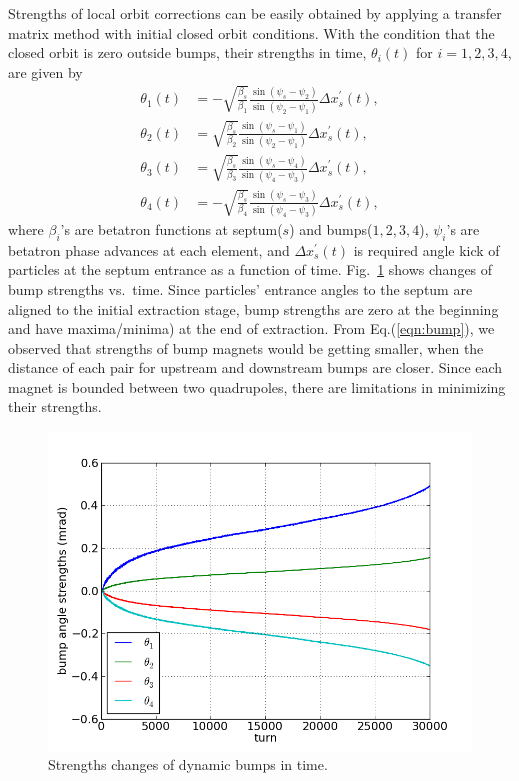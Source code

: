 \documentclass[aps,prstab,onecolumn,preprint]{revtex4-1}
\begin{document}
Strengths of local orbit corrections can be easily obtained by applying a transfer matrix method with initial closed orbit conditions. With the condition that the closed orbit is zero outside bumps, their strengths in time, $\theta_{i}(t)$ for $i=1,2,3,4$, are given by
\begin{equation}
  \begin{split}
  \theta_{1}(t) & = - \sqrt{\frac{\beta_{s}}{\beta_{1}}}
               \frac{\sin(\psi_{s} - \psi_{2})}
                    {\sin(\psi_{2} - \psi_{1})}
               \Delta x_{s}^{\prime} (t),
  \\ %
  \theta_{2}(t) & = \sqrt{\frac{\beta_{s}}{\beta_{2}}}
               \frac{\sin(\psi_{s} - \psi_{1})}
                    {\sin(\psi_{2} - \psi_{1})}
               \Delta x_{s}^{\prime} (t), \\
  \theta_{3}(t) & = \sqrt{\frac{\beta_{s}}{\beta_{3}}}
               \frac{\sin(\psi_{s} - \psi_{4})}
                    {\sin(\psi_{4} - \psi_{3})}
               \Delta x_{s}^{\prime} (t),
  \\ %
  \theta_{4}(t) & = - \sqrt{\frac{\beta_{s}}{\beta_{4}}}
               \frac{\sin(\psi_{s} - \psi_{3})}
                    {\sin(\psi_{4} - \psi_{3})}
               \Delta x_{s}^{\prime} (t),
  \end{split}
  \label{eqn:bump}
\end{equation}
where $\beta_{i}$'s are betatron functions at septum($s$) and bumps($1,2,3,4$), $\psi_{i}$'s are betatron phase advances at each element, and $\Delta x^{\prime}_{s} (t)$ is required angle kick of particles at the septum entrance as a function of time. Fig.~\ref{fig:bump3} shows changes of bump strengths vs.~time. Since particles' entrance angles to the septum are aligned to the initial extraction stage, bump strengths are zero at the beginning and have maxima/minima) at the end of extraction. From Eq.(\ref{eqn:bump}), we observed that strengths of bump magnets would be getting smaller, when the distance of each pair for upstream and downstream bumps are closer. Since each magnet is bounded between two quadrupoles, there are limitations in minimizing their strengths. 

\begin{figure}[!tbp]
  \includegraphics[width=.45\textwidth]{img/fig_bump3}
  \caption{\label{fig:bump3}Strengths changes of dynamic bumps in time.}
\end{figure}
\end{document}
